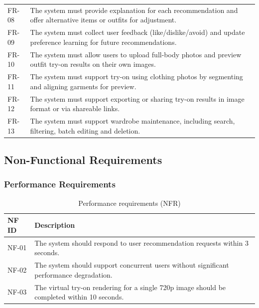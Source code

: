 \begin{table}[ht]
\begin{tabular}{p{1.6cm}p{13.2cm}}
    FR-08 &
    The system must provide explanation for each recommendation and offer alternative items or outfits for adjustment. \\
    
    FR-09 &
    The system must collect user feedback (like/dislike/avoid) and update preference learning for future recommendations. \\
    
    FR-10 &
    The system must allow users to upload full-body photos and preview outfit try-on results on their own images. \\
    
    FR-11 &
    The system must support try-on using clothing photos by segmenting and aligning garments for preview. \\
    
    FR-12 &
    The system must support exporting or sharing try-on results in image format or via shareable links. \\
    
    FR-13 &
    The system must support wardrobe maintenance, including search, filtering, batch editing and deletion. \\
    \bottomrule
\end{tabular}
\end{table}


\newpage
\subsection{Non-Functional Requirements}
\subsubsection{Performance Requirements}

\begin{table}[H]
\centering
\small
\caption{Performance requirements (NFR)}
\label{tab:nfr_performance}
\begin{tabular}{p{1.2cm}p{13.2cm}}
\toprule
\textbf{NF ID} & \textbf{Description} \\
\midrule
NF-01 & The system should respond to user recommendation requests within 3 seconds. \\
NF-02 & The system should support concurrent users without significant performance degradation. \\
NF-03 & The virtual try-on rendering for a single 720p image should be completed within 10 seconds. \\
\bottomrule
\end{tabular}
\end{table}


